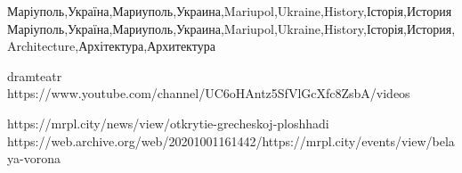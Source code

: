 Маріуполь,Україна,Мариуполь,Украина,Mariupol,Ukraine,History,Історія,История
Маріуполь,Україна,Мариуполь,Украина,Mariupol,Ukraine,History,Історія,История,Architecture,Архітектура,Архитектура

dramteatr
https://www.youtube.com/channel/UC6oHAntz5SfVlGcXfc8ZsbA/videos

https://mrpl.city/news/view/otkrytie-grecheskoj-ploshhadi
https://web.archive.org/web/20201001161442/https://mrpl.city/events/view/belaya-vorona


